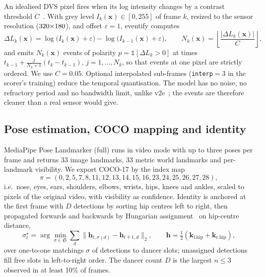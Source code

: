 \documentclass[10pt]{article}
\begin{document}
An idealised DVS pixel fires when its log intensity changes by a contrast threshold $C$~\cite{lichtsteiner2008dvs,gallego2022survey}. With grey level $I_k(\mathbf{x}) \in [0,255]$ of frame $k$, resized to the sensor resolution ($320{\times}180$), and offset $\varepsilon=1$, eventify computes
\begin{equation}
  \Delta L_k(\mathbf{x}) = \log\!\big(I_k(\mathbf{x})+\varepsilon\big) - \log\!\big(I_{k-1}(\mathbf{x})+\varepsilon\big), \qquad
  N_k(\mathbf{x}) = \left\lfloor \frac{|\Delta L_k(\mathbf{x})|}{C} \right\rfloor ,
  \label{eq:dvs}
\end{equation}
and emits $N_k(\mathbf{x})$ events of polarity $p=\mathbb{1}[\Delta L_k>0]$ at times $t_{k-1} + \frac{j}{N_k+1}(t_k - t_{k-1})$, $j=1,\dots,N_k$, so that events at one pixel are strictly ordered. We use $C=0.05$. Optional interpolated sub-frames (\texttt{interp}$=3$ in the scorer's training) reduce the temporal quantisation. The model has no noise, no refractory period and no bandwidth limit, unlike v2e~\cite{hu2021v2e}; the events are therefore cleaner than a real sensor would give.

\subsection{Pose estimation, COCO mapping and identity}
\label{sec:pose}

MediaPipe Pose Landmarker (full) runs in video mode with up to three poses per frame and returns 33 image landmarks, 33 metric world landmarks and per-landmark visibility. We export COCO-17 by the index map
\begin{equation}
  \pi = (0, 2, 5, 7, 8, 11, 12, 13, 14, 15, 16, 23, 24, 25, 26, 27, 28),
  \label{eq:coco}
\end{equation}
i.e.\ nose, eyes, ears, shoulders, elbows, wrists, hips, knees and ankles, scaled to pixels of the original video, with visibility as confidence. Identity is anchored at the first frame with $D$ detections by sorting hip centres left to right, then propagated forwards and backwards by Hungarian assignment~\cite{kuhn1955hungarian} on hip-centre distance,
\begin{equation}
  \sigma_t^\star = \arg\min_{\sigma\in\mathfrak{S}} \sum_{d} \big\|\mathbf{h}_{t,\sigma(d)} - \mathbf{h}_{t\mp1,d}\big\|_2, \qquad \mathbf{h} = \tfrac12(\mathbf{k}_{\text{l.hip}}+\mathbf{k}_{\text{r.hip}}),
  \label{eq:hungarian}
\end{equation}
over one-to-one matchings $\sigma$ of detections to dancer slots; unassigned detections fill free slots in left-to-right order. The dancer count $D$ is the largest $n\le3$ observed in at least 10\% of frames.
\end{document}
